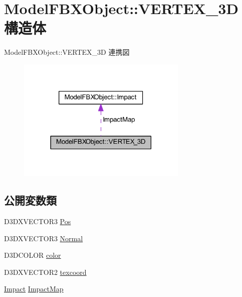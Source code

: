 \hypertarget{struct_model_f_b_x_object_1_1_v_e_r_t_e_x__3_d}{}\section{Model\+F\+B\+X\+Object\+:\+:V\+E\+R\+T\+E\+X\+\_\+3D 構造体}
\label{struct_model_f_b_x_object_1_1_v_e_r_t_e_x__3_d}


Model\+F\+B\+X\+Object\+:\+:V\+E\+R\+T\+E\+X\+\_\+3D 連携図\nopagebreak
\begin{figure}[H]
\begin{center}
\leavevmode
\includegraphics[width=230pt]{struct_model_f_b_x_object_1_1_v_e_r_t_e_x__3_d__coll__graph}
\end{center}
\end{figure}
\subsection*{公開変数類}
\begin{DoxyCompactItemize}
\item 
D3\+D\+X\+V\+E\+C\+T\+O\+R3 \mbox{\hyperlink{struct_model_f_b_x_object_1_1_v_e_r_t_e_x__3_d_a45139f19096594648725cf4ba423a153}{Pos}}
\item 
D3\+D\+X\+V\+E\+C\+T\+O\+R3 \mbox{\hyperlink{struct_model_f_b_x_object_1_1_v_e_r_t_e_x__3_d_abebed506ca81100972b14551cc8604b6}{Normal}}
\item 
D3\+D\+C\+O\+L\+OR \mbox{\hyperlink{struct_model_f_b_x_object_1_1_v_e_r_t_e_x__3_d_acddb3b5872f21abf11027cb19b04a650}{color}}
\item 
D3\+D\+X\+V\+E\+C\+T\+O\+R2 \mbox{\hyperlink{struct_model_f_b_x_object_1_1_v_e_r_t_e_x__3_d_a18087d39d9ff1bfbcc9159b4f98b73b0}{texcoord}}
\item 
\mbox{\hyperlink{struct_model_f_b_x_object_1_1_impact}{Impact}} \mbox{\hyperlink{struct_model_f_b_x_object_1_1_v_e_r_t_e_x__3_d_a188495c5b63503fd6e2ba720dcba7f19}{Impact\+Map}}
\end{DoxyCompactItemize}


